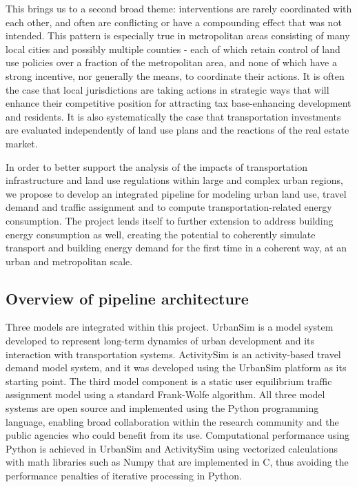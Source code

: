 This brings us to a second broad theme: interventions are rarely coordinated with each other, and often are conflicting or have a compounding effect that was not intended. This pattern is especially true in metropolitan areas consisting of many local cities and possibly multiple counties - each of which retain control of land use policies over a fraction of the metropolitan area, and none of which have a strong incentive, nor generally the means, to coordinate their actions. It is often the case that local jurisdictions are taking actions in strategic ways that will enhance their competitive position for attracting tax base-enhancing development and residents. It is also systematically the case that transportation investments are evaluated independently of land use plans and the reactions of the real estate market.

In order to better support the analysis of the impacts of transportation infrastructure and land use regulations within large and complex urban regions, we propose to develop an integrated pipeline for modeling urban land use, travel demand and traffic assignment and to compute transportation-related energy consumption. The project lends itself to further extension to address building energy consumption as well, creating the potential to coherently simulate transport and building energy demand for the first time in a coherent way, at an urban and metropolitan scale. 


\subsection{Overview of pipeline architecture}

Three models are integrated within this project. UrbanSim is a model system developed to represent long-term dynamics of urban development and its interaction with transportation systems. ActivitySim is an activity-based travel demand model system, and it was developed using the UrbanSim platform as its starting point. The third model component is a static user equilibrium traffic assignment model using a standard Frank-Wolfe algorithm.  All three model systems are open source and implemented using the Python programming language, enabling broad collaboration within the research community and the public agencies who could benefit from its use.  Computational performance using Python is achieved in UrbanSim and ActivitySim using vectorized calculations with math libraries such as Numpy that are implemented in C, thus avoiding the performance penalties of iterative processing in Python. 

